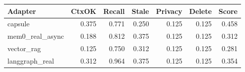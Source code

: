 \begin{tabular}{lrrrrrr}
\hline
Adapter & CtxOK & Recall & Stale & Privacy & Delete & Score \\
\hline
capsule & 0.375 & 0.771 & 0.250 & 0.125 & 0.125 & 0.458 \\
mem0\_real\_async & 0.188 & 0.812 & 0.375 & 0.125 & 0.125 & 0.312 \\
vector\_rag & 0.125 & 0.750 & 0.312 & 0.125 & 0.125 & 0.281 \\
langgraph\_real & 0.312 & 0.964 & 0.375 & 0.125 & 0.125 & 0.354 \\
\hline
\end{tabular}
